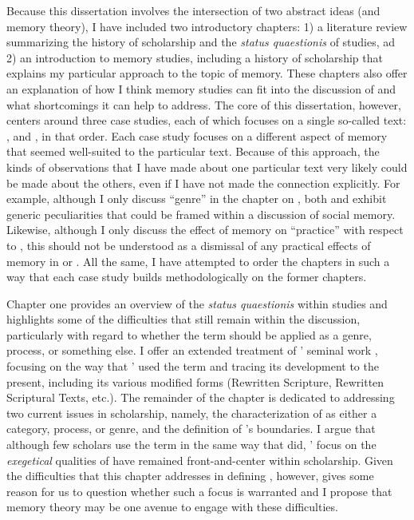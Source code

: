 Because this dissertation involves the intersection of two abstract ideas (\rwb and memory theory), I have included two introductory chapters: 1) a literature review summarizing the history of scholarship and the \emph{status quaestionis} of \rwb studies, ad 2) an introduction to memory studies, including a history of scholarship that explains my particular approach to the topic of memory. These chapters also offer an explanation of how I think memory studies can fit into the discussion of \rwb and what shortcomings it can help to address. The core of this dissertation, however, centers around three case studies, each of which focuses on a single so-called \rwb text: \chronicles, \ga and \jub, in that order. Each case study focuses on a different aspect of memory that seemed well-suited to the particular text. Because of this approach, the kinds of observations that I have made about one particular text very likely could be made about the others, even if I have not made the connection explicitly. For example, although I only discuss ``genre'' in the chapter on \ga, both \chronicles and \jub exhibit generic peculiarities that could be framed within a discussion of social memory. Likewise, although I only discuss the effect of memory on ``practice'' with respect to \jub, this should not be understood as a dismissal of any practical effects of memory in \chronicles or \ga. All the same, I have attempted to order the chapters in such a way that each case study builds methodologically on the former chapters.

Chapter one provides an overview of the \emph{status quaestionis} within \rwb studies and highlights some of the difficulties that still remain within the discussion, particularly with regard to whether the term should be applied as a genre, process, or something else. I offer an extended treatment of \vermes' seminal work , focusing on the way that \vermes' used the term and tracing its development to the present, including its various modified forms (Rewritten Scripture, Rewritten Scriptural Texts, etc.). The remainder of the chapter is dedicated to addressing two current issues in \rwb scholarship, namely, the characterization of \rwb as either a category, process, or genre, and the definition of \rwb's boundaries. I argue that although few scholars use the term \rwb in the same way that \vermes did, \vermes' focus on the \emph{exegetical} qualities of \rwb have remained front-and-center within \rwb scholarship. Given the difficulties that this chapter addresses in defining \rwb, however, gives some reason for us to question whether such a focus is warranted and I propose that memory theory may be one avenue to engage with these difficulties.

